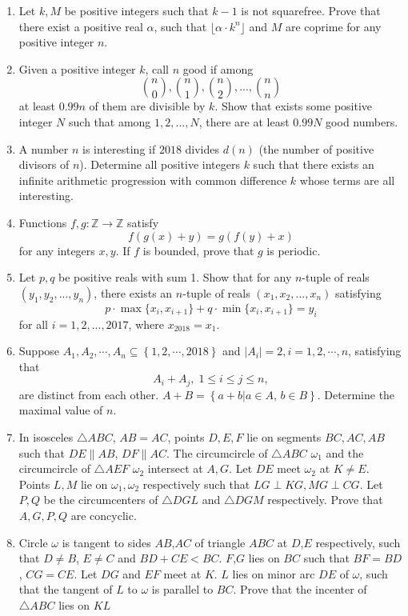 \documentclass[12pt]{article}
\begin{document}
\begin{enumerate}
		\item Let $k, M$ be positive integers such that $k-1$ is not squarefree. Prove that there exist a positive real $\alpha$, such that $\lfloor \alpha\cdot k^n \rfloor$ and $M$ are coprime for any positive integer $n$.
		
		\item Given a positive integer $k$, call $n$ good if among $$\binom{n}{0},\binom{n}{1},\binom{n}{2},...,\binom{n}{n}$$at least $0.99n$ of them are divisible by $k$. Show that exists some positive integer $N$ such that among $1,2,...,N$, there are at least $0.99N$ good numbers.
		
		\item A number $n$ is interesting if $2018$ divides $d(n)$ (the number of positive divisors of $n$). Determine all positive integers $k$ such that there exists an infinite arithmetic progression with common difference $k$ whose terms are all interesting.
		
		\item Functions $f,g:\mathbb{Z}\to\mathbb{Z}$ satisfy $$f(g(x)+y)=g(f(y)+x)$$for any integers $x,y$. If $f$ is bounded, prove that $g$ is periodic.
		
		\item Let $p,q$ be positive reals with sum 1. Show that for any $n$-tuple of reals $(y_1,y_2,...,y_n)$, there exists an $n$-tuple of reals $(x_1,x_2,...,x_n)$ satisfying $$p\cdot \max\{x_i,x_{i+1}\} + q\cdot \min\{x_i,x_{i+1}\} = y_i$$for all $i=1,2,...,2017$, where $x_{2018}=x_1$.
		
		\item Suppose $A_1,A_2,\cdots ,A_n \subseteq \left \{ 1,2,\cdots ,2018 \right \}$ and $\left | A_i \right |=2, i=1,2,\cdots ,n$, satisfying that $$A_i + A_j, \; 1 \le i \le j \le n ,$$are distinct from each other. $A + B = \left \{ a+b|a\in A,\,b\in B \right \}$. Determine the maximal value of $n$.
		
		\item In isosceles $\triangle ABC$, $AB=AC$, points $D,E,F$ lie on segments $BC,AC,AB$ such that $DE\parallel AB$, $DF\parallel AC$. The circumcircle of $\triangle ABC$ $\omega_1$ and the circumcircle of $\triangle AEF$ $\omega_2$ intersect at $A,G$. Let $DE$ meet $\omega_2$ at $K\neq E$. Points $L,M$ lie on $\omega_1,\omega_2$ respectively such that $LG\perp KG, MG\perp CG$. Let $P,Q$ be the circumcenters of $\triangle DGL$ and $\triangle DGM$ respectively. Prove that $A,G,P,Q$ are concyclic.
		
		\item Circle $\omega$ is tangent to sides $AB$,$AC$ of triangle $ABC$ at $D$,$E$ respectively, such that $D\neq B$, $E\neq C$ and $BD+CE<BC$. $F$,$G$ lies on $BC$ such that $BF=BD$, $CG=CE$. Let $DG$ and $EF$ meet at $K$. $L$ lies on minor arc $DE$ of $\omega$, such that the tangent of $L$ to $\omega$ is parallel to $BC$. Prove that the incenter of $\triangle ABC$ lies on $KL$
		
		
		
		
		
		
		
		
		
	\end{enumerate}
\end{document}
